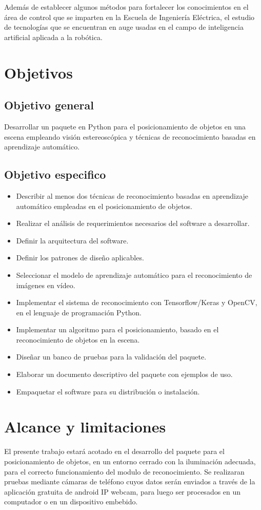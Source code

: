 Además de establecer algunos métodos para fortalecer los conocimientos en el área de control  que se imparten en la Escuela de Ingeniería Eléctrica, el estudio de tecnologías que se encuentran en auge usadas en el campo de inteligencia artificial aplicada a la robótica. 
\section{Objetivos}
\subsection{Objetivo general}
Desarrollar un paquete en Python para el posicionamiento de objetos en una escena empleando visión estereoscópica y técnicas de reconocimiento basadas en aprendizaje automático.
\subsection{Objetivo especifico}
\begin{itemize}
    \item Describir al menos dos técnicas de reconocimiento basadas en aprendizaje automático empleadas en el posicionamiento de objetos.
    \item Realizar el análisis de requerimientos necesarios del software a desarrollar.
    \item Definir la arquitectura del software.
    \item Definir los patrones de diseño aplicables.
    \item Seleccionar el modelo de aprendizaje automático para el reconocimiento de imágenes en vídeo.
    \item Implementar el sistema de reconocimiento con Tensorflow/Keras y OpenCV, en el lenguaje de programación Python.
    \item Implementar un algoritmo para el posicionamiento, basado en el reconocimiento de objetos en la escena.
    \item Diseñar un banco de pruebas para la validación del paquete.
    \item Elaborar un documento descriptivo del paquete con ejemplos de uso.
    \item Empaquetar el software para su distribución o instalación.
\end{itemize}
\section{Alcance y limitaciones}
El presente trabajo estará acotado en el desarrollo del paquete para el posicionamiento de objetos, en un entorno cerrado con la iluminación adecuada, para el correcto funcionamiento del modulo de reconocimiento. Se realizaran pruebas mediante cámaras de teléfono cuyos datos serán enviados a través de la aplicación gratuita de android IP webcam, para luego ser procesados en un computador o en un dispositivo embebido.
